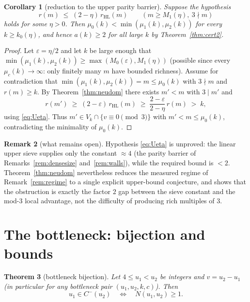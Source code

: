 \documentclass[11pt]{article}
\theoremstyle{plain}
\newtheorem{theorem}{Theorem}[section]
\newtheorem{corollary}[theorem]{Corollary}
\theoremstyle{definition}
\newtheorem{remark}[theorem]{Remark}
\newcommand{\rch}{r}
\newcommand{\Vk}{V_{k}}
\begin{document}
\begin{corollary}[reduction to the upper parity barrier]
\label{cor:parity}
Suppose the hypothesis
\begin{equation}\label{eq:Ueta}\tag{$U_\eta$}
\rch(m) \;\le\; (2 - \eta)\, r_{\mathrm{HL}}(m)
\qquad (m \ge M_1(\eta),\ 3 \nmid m)
\end{equation}
holds for some $\eta > 0$. Then
$\mu_0(k) < \min(\mu_1(k),\mu_2(k))$ for every $k \ge k_0(\eta)$,
and hence $a(k) \ge 2$ for all large $k$ by
Theorem~\ref{thm:cert2}.
\end{corollary}

\begin{proof}
Let $\varepsilon = \eta/2$ and let $k$ be large enough that
$\min(\mu_1(k),\mu_2(k)) \ge \max(M_0(\varepsilon), M_1(\eta))$
(possible since every $\mu_c(k) \to \infty$: only finitely many $m$
have bounded richness). Assume for contradiction that
$\min(\mu_1(k),\mu_2(k)) = m \le \mu_0(k)$ with $3 \nmid m$ and
$\rch(m) \ge k$. By Theorem~\ref{thm:neudom} there exists $m' < m$
with $3 \mid m'$ and
\[
\rch(m') \;\ge\; (2-\varepsilon)\,r_{\mathrm{HL}}(m)
\;\ge\; \frac{2-\varepsilon}{2-\eta}\,\rch(m)
\;>\;
k,
\]
using \eqref{eq:Ueta}. Thus $m' \in \Vk \cap \{v \equiv 0 \pmod 3\}$
with $m' < m \le \mu_0(k)$, contradicting the minimality of
$\mu_0(k)$.
\end{proof}

\begin{remark}[what remains open]\label{rem:openparity}
Hypothesis \eqref{eq:Ueta} is unproved: the linear upper sieve
supplies only the constant $\approx 4$ (the parity barrier of
Remarks~\ref{rem:densesize} and~\ref{rem:walls}), while the required
bound is $< 2$. Theorem~\ref{thm:neudom} nevertheless reduces the
measured regime of Remark~\ref{rem:regime} to a single explicit
upper-bound conjecture, and shows that the obstruction is exactly
the factor $2$ gap between the sieve constant and the mod-$3$
local advantage, not the difficulty of producing rich multiples of
$3$.
\end{remark}

\section{The bottleneck: bijection and bounds}
\label{sec:bij}

\begin{theorem}[bottleneck bijection]\label{thm:bij}
Let $4 \le u_1 < u_2$ be integers and $v = u_2 - u_1$ (in
particular for any bottleneck pair $(u_1,u_2,k,c)$). Then
\[
u_1 \in C^{-}(u_2) \quad\Longleftrightarrow\quad N(u_1,u_2) \ge 1.
\]
\end{theorem}
\end{document}
